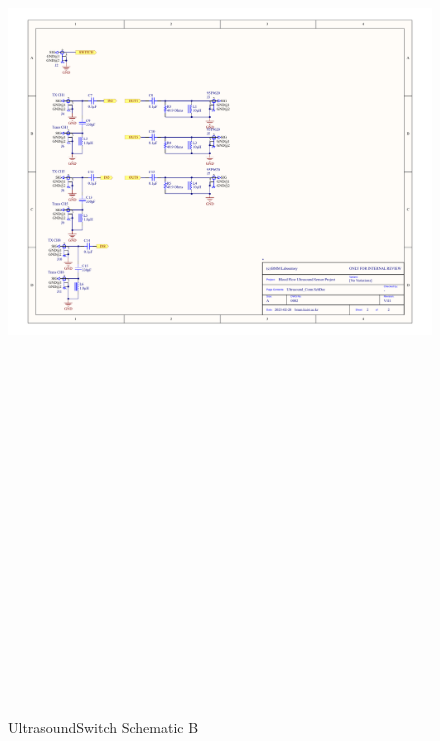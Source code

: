 \begin{landscape}
	\begin{figure}[htbp]
		\centering
		\includegraphics[width=20cm,height=28.7cm,keepaspectratio]{Figures/appendix/ultrasound_conn.pdf}
		\caption{UltrasoundSwitch Schematic B}
		\label{fig:appendix_ultrasoundswitch_b}
	\end{figure}
\end{landscape}


